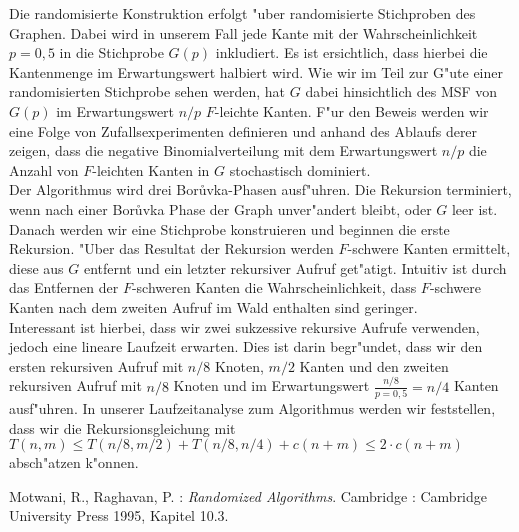 \documentclass[a4paper,12pt,times,german]{cls/summary}
\begin{document}
Die randomisierte Konstruktion erfolgt "uber randomisierte Stichproben 
    des Graphen.
    Dabei wird in unserem Fall jede Kante mit der Wahrscheinlichkeit $p=0,5$
    in die Stichprobe $G(p)$ inkludiert. 
    Es ist ersichtlich, dass hierbei die Kantenmenge im Erwartungswert
    halbiert wird.
    Wie wir im Teil zur G"ute einer randomisierten Stichprobe sehen werden, 
    hat $G$ dabei hinsichtlich des MSF von $G(p)$ im Erwartungswert $n/p$
    $F$-leichte Kanten. 
    F"ur den Beweis werden wir eine Folge von Zufallsexperimenten definieren
    und anhand des Ablaufs derer zeigen, dass die negative Binomialverteilung
    mit dem Erwartungswert $n/p$ die Anzahl von $F$-leichten Kanten in $G$
    stochastisch dominiert.\\
Der Algorithmus wird drei Bor\r uvka-Phasen ausf"uhren.
    Die Rekursion terminiert, wenn nach einer Bor\r uvka Phase der Graph 
    unver"andert bleibt, oder $G$ leer ist.
    Danach werden wir eine Stichprobe konstruieren und beginnen die erste
    Rekursion.
    "Uber das Resultat der Rekursion werden $F$-schwere Kanten ermittelt, 
    diese aus $G$ entfernt und ein letzter rekursiver Aufruf get"atigt.
    Intuitiv ist durch das Entfernen der $F$-schweren Kanten die 
    Wahrscheinlichkeit, dass $F$-schwere Kanten nach dem zweiten Aufruf im 
    Wald enthalten sind geringer.\\
Interessant ist hierbei, dass wir zwei sukzessive rekursive Aufrufe verwenden, jedoch
    eine lineare Laufzeit erwarten.
    Dies ist darin begr"undet, dass wir den ersten rekursiven Aufruf mit 
    $n/8$ Knoten, $m/2$ Kanten und den zweiten rekursiven Aufruf mit $n/8$ Knoten
    und im Erwartungswert
    $\frac{n/8}{p=0,5} = n/4$ Kanten ausf"uhren.
    In unserer Laufzeitanalyse zum Algorithmus werden wir feststellen, dass
    wir die Rekursionsgleichung mit 
    $T(n,m) \leq T(n/8,m/2) + T(n/8, n/4) + c(n+m) \leq 2 \cdot c(n+m)$
    absch"atzen k"onnen.\\
\begin{thebibliography}{}
\footnotesize
{} 
    Motwani, R., Raghavan, P. :
    \textit{Randomized Algorithms}. Cambridge :
    Cambridge University Press 1995, Kapitel 10.3.
\end{thebibliography}
\end{document}
